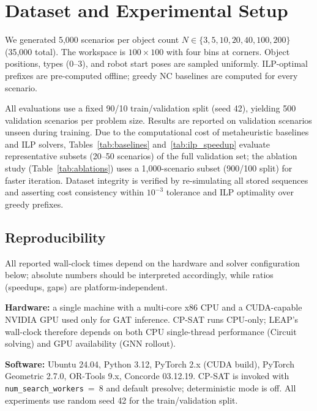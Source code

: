 \documentclass[review,times]{elsarticle}
\begin{document}
\section{Dataset and Experimental Setup}\label{sec:data}

We generated 5{,}000 scenarios per object count $N \in \{3, 5, 10, 20, 40, 100, 200\}$ (35{,}000 total). The workspace is $100 \times 100$ with four bins at corners. Object positions, types (0--3), and robot start poses are sampled uniformly. ILP-optimal prefixes are pre-computed offline; greedy NC baselines are computed for every scenario.

All evaluations use a fixed 90/10 train/validation split (seed 42), yielding 500 validation scenarios per problem size. Results are reported on validation scenarios unseen during training. Due to the computational cost of metaheuristic baselines and ILP solvers, Tables~\ref{tab:baselines} and~\ref{tab:ilp_speedup} evaluate representative subsets (20--50 scenarios) of the full validation set; the ablation study (Table~\ref{tab:ablations}) uses a 1{,}000-scenario subset (900/100 split) for faster iteration. Dataset integrity is verified by re-simulating all stored sequences and asserting cost consistency within $10^{-3}$ tolerance and ILP optimality over greedy prefixes.

\subsection{Reproducibility}\label{sec:reproducibility}

All reported wall-clock times depend on the hardware and solver configuration below; absolute numbers should be interpreted accordingly, while ratios (speedups, gaps) are platform-independent.

\textbf{Hardware:} a single machine with a multi-core x86 CPU and a CUDA-capable NVIDIA GPU used only for GAT inference. CP-SAT runs CPU-only; LEAP's wall-clock therefore depends on both CPU single-thread performance (Circuit solving) and GPU availability (GNN rollout).

\textbf{Software:} Ubuntu 24.04, Python 3.12, PyTorch 2.x (CUDA build), PyTorch Geometric 2.7.0, OR-Tools 9.x, Concorde 03.12.19. CP-SAT is invoked with \texttt{num\_search\_workers}~=~8 and default presolve; deterministic mode is off. All experiments use random seed 42 for the train/validation split.
\end{document}
